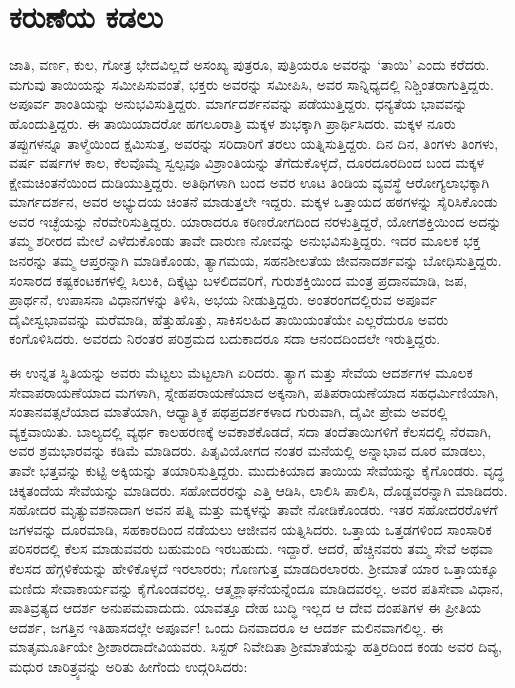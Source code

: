 \section*{ಕರುಣೆಯ ಕಡಲು}


ಜಾತಿ, ವರ್ಣ, ಕುಲ, ಗೋತ್ರ ಭೇದವಿಲ್ಲದೆ ಅಸಂಖ್ಯ ಪುತ್ರರೂ, ಪುತ್ರಿಯರೂ ಅವರನ್ನು ‘ತಾಯಿ’ ಎಂದು ಕರೆದರು. ಮಗುವು ತಾಯಿಯನ್ನು ಸಮೀಪಿಸುವಂತೆ, ಭಕ್ತರು ಅವರನ್ನು ಸಮೀಪಿಸಿ, ಅವರ ಸಾನ್ನಿಧ್ಯದಲ್ಲಿ ನಿಶ್ಚಿಂತರಾಗುತ್ತಿದ್ದರು. ಅಪೂರ್ವ ಶಾಂತಿಯನ್ನು ಅನುಭವಿಸುತ್ತಿದ್ದರು. ಮಾರ್ಗದರ್ಶನವನ್ನು ಪಡೆಯುತ್ತಿದ್ದರು. ಧನ್ಯತೆಯ ಭಾವವನ್ನು ಹೊಂದುತ್ತಿದ್ದರು. ಈ ತಾಯಿಯಾದರೋ ಹಗಲೂರಾತ್ರಿ ಮಕ್ಕಳ ಶುಭಕ್ಕಾಗಿ ಪ್ರಾರ್ಥಿಸಿದರು. ಮಕ್ಕಳ ನೂರು ತಪ್ಪುಗಳನ್ನೂ ತಾಳ್ಮೆಯಿಂದ ಕ್ಷಮಿಸುತ್ತ, ಅವರನ್ನು ಸರಿದಾರಿಗೆ ತರಲು ಯತ್ನಿಸುತ್ತಿದ್ದರು. ದಿನ ದಿನ, ತಿಂಗಳು ತಿಂಗಳು, ವರ್ಷ ವರ್ಷಗಳ ಕಾಲ, ಕೆಲವೊಮ್ಮೆ ಸ್ವಲ್ಪವೂ ವಿಶ್ರಾಂತಿಯನ್ನು ತೆಗೆದುಕೊಳ್ಳದೆ, ದೂರದೂರದಿಂದ ಬಂದ ಮಕ್ಕಳ ಕ್ಷೇಮಚಿಂತನೆಯಿಂದ ದುಡಿಯುತ್ತಿದ್ದರು. ಅತಿಥಿಗಳಾಗಿ ಬಂದ ಅವರ ಊಟ ತಿಂಡಿಯ ವ್ಯವಸ್ಥೆ ಆರೋಗ್ಯಲಾಭಕ್ಕಾಗಿ ಮಾರ್ಗದರ್ಶನ, ಅವರ ಅಭ್ಯುದಯ ಚಿಂತನೆ ಮಾಡುತ್ತಲೇ ಇದ್ದರು. ಮಕ್ಕಳ ಒತ್ತಾಯದ ಹಠಗಳನ್ನು ಸೈರಿಸಿಕೊಂಡು ಅವರ ಇಚ್ಛೆಯನ್ನು ನೆರವೇರಿಸುತ್ತಿದ್ದರು. ಯಾರಾದರೂ ಕಠಿಣರೋಗದಿಂದ ನರಳುತ್ತಿದ್ದರೆ, ಯೋಗಶಕ್ತಿಯಿಂದ ಅದನ್ನು ತಮ್ಮ ಶರೀರದ ಮೇಲೆ ಎಳೆದುಕೊಂಡು ತಾವೇ ದಾರುಣ ನೋವನ್ನು ಅನುಭವಿಸುತ್ತಿದ್ದರು. ಇದರ ಮೂಲಕ ಭಕ್ತ ಜನರನ್ನು ತಮ್ಮ ಆಪ್ತರನ್ನಾಗಿ ಮಾಡಿಕೊಂಡು, ತ್ಯಾಗಮಯ, ಸಹನಶೀಲತೆಯ ಜೀವನಾದರ್ಶವನ್ನು ಬೋಧಿಸುತ್ತಿದ್ದರು. ಸಂಸಾರದ ಕಷ್ಟಕಂಟಕಗಳಲ್ಲಿ ಸಿಲುಕಿ, ದಿಕ್ಕೆಟ್ಟು ಬಳಲಿ\-ದವರಿಗೆ, ಗುರುಶಕ್ತಿಯಿಂದ ಮಂತ್ರ ಪ್ರದಾನಮಾಡಿ, ಜಪ, ಪ್ರಾರ್ಥನೆ, ಉಪಾಸನಾ ವಿಧಾನಗಳನ್ನು ತಿಳಿಸಿ, ಅಭಯ ನೀಡುತ್ತಿದ್ದರು. ಅಂತರಂಗದಲ್ಲಿರುವ ಅಪೂರ್ವ ದೈವೀಸ್ವಭಾವವನ್ನು ಮರೆಮಾಡಿ, ಹೆತ್ತುಹೊತ್ತು, ಸಾಕಿಸಲಹಿದ ತಾಯಿಯಂತೆಯೇ ಎಲ್ಲರೆದುರೂ ಅವರು ಕಂಗೊಳಿಸಿದರು. ಅವರದು ನಿರಂತರ ಪರಿಶ್ರಮದ ಬದುಕಾದರೂ ಸದಾ ಆನಂದದಿಂದಲೇ ಇರುತ್ತಿದ್ದರು.

ಈ ಉನ್ನತ ಸ್ಥಿತಿಯನ್ನು ಅವರು ಮೆಟ್ಟಲು ಮೆಟ್ಟಲಾಗಿ ಏರಿದರು. ತ್ಯಾಗ ಮತ್ತು ಸೇವೆಯ ಆದರ್ಶಗಳ ಮೂಲಕ ಸೇವಾಪರಾಯಣೆಯಾದ ಮಗಳಾಗಿ, ಸ್ನೇಹಪರಾಯಣೆಯಾದ ಅಕ್ಕನಾಗಿ, ಪತಿಪರಾಯಣೆಯಾದ ಸಹಧರ್ಮಿಣಿಯಾಗಿ, ಸಂತಾನವತ್ಸಲೆಯಾದ ಮಾತೆಯಾಗಿ, ಆಧ್ಯಾತ್ಮಿಕ ಪಥಪ್ರದರ್ಶಕಳಾದ ಗುರುವಾಗಿ, ದೈವೀ ಪ್ರೇಮ ಅವರಲ್ಲಿ ವ್ಯಕ್ತವಾಯಿತು. ಬಾಲ್ಯದಲ್ಲಿ ವ್ಯರ್ಥ ಕಾಲಹರಣಕ್ಕೆ ಅವಕಾಶಕೊಡದೆ, ಸದಾ ತಂದೆತಾಯಿಗಳಿಗೆ ಕೆಲಸದಲ್ಲಿ ನೆರವಾಗಿ, ಅವರ ಶ್ರಮಭಾರವನ್ನು ಕಡಿಮೆ ಮಾಡಿದರು. ಪಿತೃವಿಯೋಗದ ನಂತರ ಮನೆಯಲ್ಲಿ ಅನ್ನಾಭಾವ ದೂರ ಮಾಡಲು, ತಾವೇ ಭತ್ತವನ್ನು ಕುಟ್ಟಿ ಅಕ್ಕಿಯನ್ನು ತಯಾರಿಸುತ್ತಿದ್ದರು. ಮುದುಕಿಯಾದ ತಾಯಿಯ ಸೇವೆಯನ್ನು ಕೈಗೊಂಡರು. ವೃದ್ಧ ಚಿಕ್ಕತಂದೆಯ ಸೇವೆಯನ್ನು ಮಾಡಿದರು. ಸಹೋದರರನ್ನು ಎತ್ತಿ ಆಡಿಸಿ, ಲಾಲಿಸಿ ಪಾಲಿಸಿ, ದೊಡ್ಡವರನ್ನಾಗಿ ಮಾಡಿದರು. ಸಹೋದರ ಮೃತ್ಯುವಶನಾದಾಗ ಅವನ ಪತ್ನಿ ಮತ್ತು ಮಕ್ಕಳನ್ನು ತಾವೇ ನೋಡಿಕೊಂಡರು. ಇತರ ಸಹೋದರರೊಳಗೆ ಜಗಳವನ್ನು ದೂರಮಾಡಿ, ಸಹಕಾರದಿಂದ ನಡೆಯಲು ಆಜೀವನ ಯತ್ನಿಸಿದರು. ಒತ್ತಾಯ ಒತ್ತಡಗಳಿಂದ ಸಾಂಸಾರಿಕ ಪರಿಸರದಲ್ಲಿ ಕೆಲಸ ಮಾಡುವವರು ಬಹುಮಂದಿ ಇರಬಹುದು. ಇದ್ದಾರೆ. ಆದರೆ, ಹೆಚ್ಚಿನವರು ತಮ್ಮ ಸೇವೆ ಅಥವಾ ಕೆಲಸದ ಹೆಗ್ಗಳಿಕೆಯನ್ನು ಹೇಳಿಕೊಳ್ಳದೆ ಇರಲಾರರು; ಗೊಣಗುತ್ತ ಮಾಡದಿರಲಾರರು. ಶ‍್ರೀಮಾತೆ ಯಾರ ಒತ್ತಾಯಕ್ಕೂ ಮಣಿದು ಸೇವಾಕಾರ್ಯವನ್ನು ಕೈಗೊಂಡವರಲ್ಲ. ಆತ್ಮಶ್ಲಾಘನೆಯನ್ನೆಂದೂ ಮಾಡಿದವರಲ್ಲ. ಅವರ ಪತಿಸೇವಾ ವಿಧಾನ, ಪಾತಿವ್ರತ್ಯದ ಆದರ್ಶ ಅನುಪಮವಾದುದು. ಯಾವತ್ತೂ ದೇಹ ಬುದ್ಧಿ ಇಲ್ಲದ ಆ ದೇವ ದಂಪತಿಗಳ ಈ ಪ್ರೀತಿಯ ಆದರ್ಶ, ಜಗತ್ತಿನ ಇತಿಹಾಸದಲ್ಲೇ ಅಪೂರ್ವ! ಒಂದು ದಿನವಾದರೂ ಆ ಆದರ್ಶ ಮಲಿನವಾಗಲಿಲ್ಲ. ಈ ಮಾತೃಮೂರ್ತಿಯೇ ಶ‍್ರೀಶಾರದಾದೇವಿಯವರು. ಸಿಸ್ಟರ್ ನಿವೇದಿತಾ ಶ‍್ರೀಮಾತೆಯನ್ನು ಹತ್ತಿರದಿಂದ ಕಂಡು ಅವರ ದಿವ್ಯ, ಮಧುರ ಚಾರಿತ್ರ್ಯವನ್ನು ಅರಿತು ಹೀಗೆಂದು ಉದ್ಗರಿಸಿದರು:

